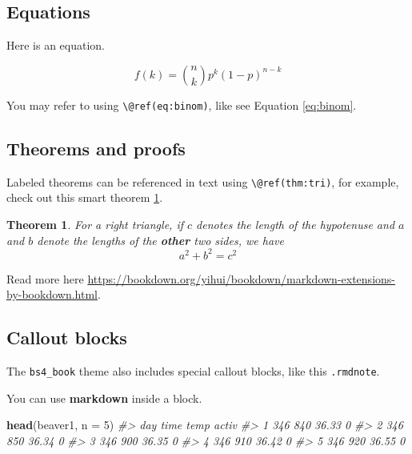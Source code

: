 \documentclass[
  xelatex, ja=standard]{bxjsbook}
\newenvironment{Shaded}{\begin{snugshade}}{\end{snugshade}}
\newcommand{\AttributeTok}[1]{\textcolor[rgb]{0.13,0.29,0.53}{#1}}
\newcommand{\CommentTok}[1]{\textcolor[rgb]{0.56,0.35,0.01}{\textit{#1}}}
\newcommand{\DecValTok}[1]{\textcolor[rgb]{0.00,0.00,0.81}{#1}}
\newcommand{\FunctionTok}[1]{\textcolor[rgb]{0.13,0.29,0.53}{\textbf{#1}}}
\newcommand{\NormalTok}[1]{#1}
\newtheorem{theorem}{Theorem}[chapter]
\theoremstyle{definition}
\theoremstyle{definition}
\theoremstyle{definition}
\theoremstyle{definition}
\theoremstyle{remark}
\begin{document}
\hypertarget{equations}{%
\subsection{Equations}\label{equations}}

Here is an equation.

\begin{equation} 
  f\left(k\right) = \binom{n}{k} p^k\left(1-p\right)^{n-k}
  \label{eq:binom}
\end{equation}

You may refer to using \texttt{\textbackslash{}@ref(eq:binom)}, like see Equation \eqref{eq:binom}.

\hypertarget{theorems-and-proofs}{%
\subsection{Theorems and proofs}\label{theorems-and-proofs}}

Labeled theorems can be referenced in text using \texttt{\textbackslash{}@ref(thm:tri)}, for example, check out this smart theorem \ref{thm:tri}.

\begin{theorem}
\protect\hypertarget{thm:tri}{}\label{thm:tri}For a right triangle, if \(c\) denotes the \emph{length} of the hypotenuse and \(a\) and \(b\) denote the lengths of the \textbf{other} two sides, we have \[a^2 + b^2 = c^2\]
\end{theorem}

Read more here \url{https://bookdown.org/yihui/bookdown/markdown-extensions-by-bookdown.html}.

\hypertarget{callout-blocks}{%
\subsection{Callout blocks}\label{callout-blocks}}

The \texttt{bs4\_book} theme also includes special callout blocks, like this \texttt{.rmdnote}.

You can use \textbf{markdown} inside a block.

\begin{Shaded}
\begin{Highlighting}[]
\FunctionTok{head}\NormalTok{(beaver1, }\AttributeTok{n =} \DecValTok{5}\NormalTok{)}
\CommentTok{\#\textgreater{}   day time  temp activ}
\CommentTok{\#\textgreater{} 1 346  840 36.33     0}
\CommentTok{\#\textgreater{} 2 346  850 36.34     0}
\CommentTok{\#\textgreater{} 3 346  900 36.35     0}
\CommentTok{\#\textgreater{} 4 346  910 36.42     0}
\CommentTok{\#\textgreater{} 5 346  920 36.55     0}
\end{Highlighting}
\end{Shaded}
\end{document}
